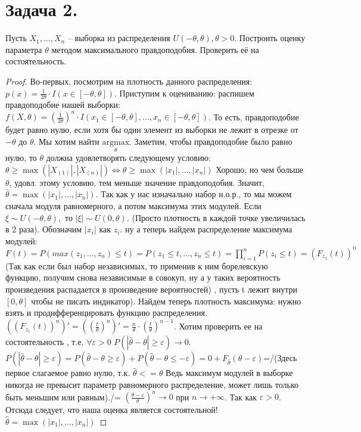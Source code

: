 \documentclass{article}
\newcommand{\argmax}[1]{\underset{#1}{\mathrm{argmax}}}
\theoremstyle{plain}
\theoremstyle{definition}
\begin{document}
	
	
\section{Задача 2.}
 Пусть $X_1, \dots , X_n$ – выборка из распределения 
 $U(-\theta,\theta), \theta > 0$. Построить оценку параметра 
 $\theta$ методом максимального правдоподобия. Проверить её на состоятельность.	
\begin{proof}
	Во-первых, посмотрим на плотность данного распределения: $p(x) = \frac{1}{2\theta} \cdot I(x \in [-\theta, \theta])$. Приступим к оцениванию: распишем правдоподобие нашей выборки: $f(X, \theta) = (\frac{1}{2\theta})^n \cdot I(x_1 \in [-\theta, \theta], \dots , x_n \in [-\theta, \theta])$. То есть, правдоподобие будет равно нулю, если хотя бы один элемент из выборки не лежит в отрезке от $-\theta$ до $\theta$. Мы хотим найти $\argmax{\theta}$. Заметим, чтобы правдоподобие было равно нулю, то $\theta$ должна удовлетворять следующему условию: $\theta \geq \max{(|X_{(1)}|, |X_{(n)}|)} \Leftrightarrow \theta \geq \max{(|x_1|, \dots ,|x_n|)}$ Хорошо, но чем больше $\theta$, удовл. этому условию, тем меньше значение правдоподобия. Значит, $\hat{\theta} = \max{(|x_1|, \dots ,|x_n|)}$. Так как у нас изначально набор н.о.р., то мы можем сначала модуля равномерного, а потом максимума этих модулей. Если $\xi \sim U(-\theta, \theta),$ то $|\xi| \sim U(0, \theta)$. (Просто плотность в каждой точке увеличилась в 2 раза). Обозначим $|x_i|$ как $z_i$. ну а теперь найдем распределение максимума модулей: $F(t) = P(max(z_1, \dots , z_n) \leq t) = P(z_1 \leq t, \dots , z_n \leq t) = \prod\limits_{i = 1}^{n}P(z_i \leq t) = (F_{z_1}(t))^n$ (Так как если был набор независимых, то применив к ним борелевскую функцию, получим снова независимые в совокуп, ну а у таких вероятность произведения распадается в произведение вероятностей)
	,	пусть t лежит внутри $[0, \theta]$ чтобы не писать индикатор).
	Найдем теперь плотность максимума: нужно взять и продифференцировать функцию распределения. $((F_{z_1}(t))^n)' = ((\frac{t}{\theta})^n)' = \frac{n}{\theta} \cdot (\frac{t}{\theta})^{n - 1}$. Хотим проверить ее на состоятельность , т.е.
		 $\forall \varepsilon > 0$    $ P(|\hat{\theta} - \theta| \geq \varepsilon) \to 0$. $P(|\hat{\theta} - \theta| \geq \varepsilon) = P(\hat{\theta} - \theta \geq \varepsilon) + P(\hat{\theta} - \theta \leq -\varepsilon) = 0 + F_{\hat{\theta}}(\theta - \varepsilon)$=/(Здесь первое слагаемое равно нулю, т.к. $\hat{\theta} <= \theta$ Ведь максимум модулей в выборке никогда не превысит параметр равномерного распределение, может лишь только быть меньшим или равным)./= $ (\frac{\theta - \varepsilon}{\theta})^n \to 0$ при $n \to +\infty$. Так как $\varepsilon > 0$. Отсюда следует, что наша оценка является состоятельной!
		 $\hat{\theta} = \max{(|x_1|, \dots ,|x_n|)}$ 
	\end{proof}
	
\end{document}
